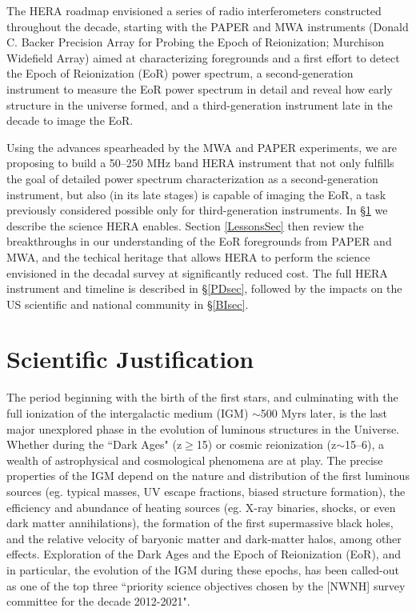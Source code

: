 \documentclass[preprint]{aastex}
\begin{document}
The HERA roadmap envisioned a series of radio interferometers constructed throughout the decade, starting with the PAPER and MWA instruments (Donald C. Backer Precision Array for Probing the Epoch of Reionization; Murchison Widefield Array) aimed at characterizing foregrounds and a first effort to detect the Epoch of Reionization (EoR) power spectrum, a second-generation instrument to measure the EoR power spectrum in detail and reveal how early structure in the universe formed, and a third-generation instrument late in the decade to image the EoR. 

Using the advances spearheaded by the MWA and PAPER experiments, we are proposing to build a 50--250 MHz band HERA instrument that not only fulfills the goal of detailed power spectrum characterization as a second-generation instrument, but also (in its late stages) is capable of imaging the EoR, a task previously considered possible only for third-generation instruments.
In \S \ref{SJsec} we describe the science HERA enables. Section \ref{LessonsSec} then review the breakthroughs in our understanding of the EoR foregrounds from PAPER and MWA, and the techical heritage that allows HERA to perform the science envisioned in the decadal survey at significantly reduced cost. The full HERA instrument and timeline is described in \S \ref{PDsec}, followed by the impacts on the US scientific and national community in \S \ref{BIsec}.

\vspace{-0.25in}
\section{Scientific Justification}
\label{SJsec}

The period beginning with the birth of the first stars, and culminating with the full ionization of the intergalactic medium (IGM) $\sim$500 Myrs later, is the last major unexplored phase in the evolution of luminous structures in the Universe.  Whether during the ``Dark Ages" (z$\ge$15) or cosmic reionization (z$\sim$15--6), a wealth of astrophysical and cosmological phenomena are at play.  The precise properties of the IGM depend on the nature and distribution of the first luminous sources (eg. typical masses, UV escape fractions, biased structure formation), the efficiency and abundance of heating sources (eg. X-ray binaries, shocks, or even dark matter annihilations), the formation of the first supermassive black holes, and the relative velocity of baryonic matter and dark-matter halos, among other effects.  Exploration of the Dark Ages and the Epoch of Reionization (EoR), and in particular, the evolution of the IGM during these epochs, has been called-out as one of the top three ``priority science objectives chosen by the [NWNH] survey committee for the decade 2012-2021".
\end{document}
